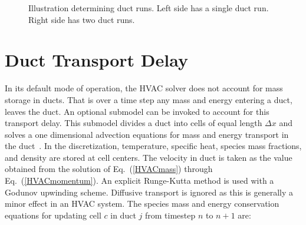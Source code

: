 \begin{figure}[ht!]
   \begin{center}
      \caption[Illustration of determining duct runs.]{\label{HVAC_ductrun} Illustration determining duct runs. Left side has a single duct run. Right side has two duct runs.}
   \end{center}
\end{figure}

\section{Duct Transport Delay}
\label{sec:duct_transport}

In its default mode of operation, the HVAC solver does not account for mass storage in ducts. That is over a time step any mass and energy entering a duct, leaves the duct. An optional submodel can be invoked to account for this transport delay. This submodel divides a duct into cells of equal length $\Delta x$ and solves a one dimensional advection equations for mass and energy transport in the duct~\cite{Ralph:3}. In the discretization, temperature, specific heat, species mass fractions, and density are stored at cell centers. The velocity in duct is taken as the value obtained from the solution of Eq.~(\ref{HVACmass}) through Eq.~(\ref{HVACmomentum}). An explicit Runge-Kutta method is used with a Godunov upwinding scheme. Diffusive transport is ignored as this is generally a minor effect in an HVAC system. The species mass and energy conservation equations for updating cell $c$ in duct $j$ from timestep $n$ to $n+1$ are:

